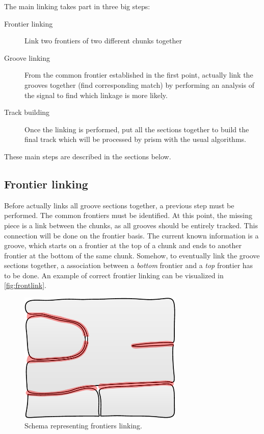 The main linking takes part in three big steps:

\begin{description}
\item[Frontier linking] Link two frontiers of two different chunks together
\item[Groove linking] From the common frontier established in the first point, actually link the grooves together (find corresponding match) by performing an analysis of the signal to find which linkage is more likely.
\item[Track building] Once the linking is performed, put all the sections together to build the final track which will be processed by \gls{prism} with the usual algorithms.
\end{description}

These main steps are described in the sections below.

\subsection{Frontier linking}

Before actually links all groove sections together, a previous step must be performed. The common frontiers must be identified. At this point, the missing piece is a link between the chunks, as all grooves should be entirely tracked. This connection will be done on the frontier basis. The current known information is a groove, which starts on a frontier at the top of a chunk and ends to another frontier at the bottom of the same chunk. Somehow, to eventually link the groove sections together, a association between a \emph{bottom} frontier and a \emph{top} frontier has to be done. An example of correct frontier linking can be visualized in \autoref{fig:frontlink}.

\begin{figure}[!ht]
\centering
\includegraphics[width=0.7\textwidth]{images/frontiers-linking}
\caption{Schema representing frontiers linking.}
\label{fig:frontlink}
\end{figure}

